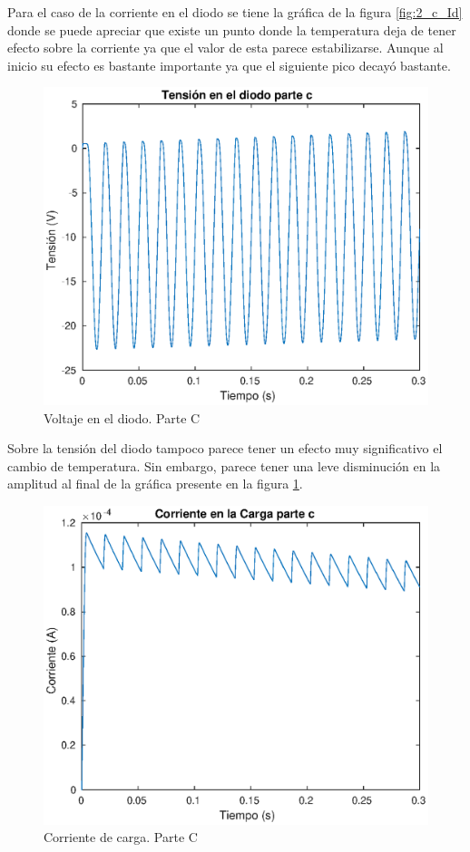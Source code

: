 \documentclass[12pt,letterpaper]{article}
\begin{document}
Para el caso de la corriente en el diodo se tiene la gráfica de la figura \ref{fig:2_c_Id} donde se puede apreciar que existe un punto donde la temperatura deja de tener efecto sobre la corriente ya que el valor de esta parece estabilizarse. Aunque al inicio su efecto es bastante importante ya que el siguiente pico decayó bastante.

\begin{figure}[ht!]
  \centering
  \includegraphics[width=0.8\linewidth]{pictures/Ejercicio2_c_Vd.eps}
  \caption{Voltaje en el diodo. Parte C}
  \label{fig:2_c_Vd}
\end{figure}

Sobre la tensión del diodo tampoco parece tener un efecto muy significativo el cambio de temperatura. Sin embargo, parece tener una leve disminución en la amplitud al final de la gráfica presente en la figura \ref{fig:2_c_Vd}.

\begin{figure}[ht!]
  \centering
  \includegraphics[width=0.8\linewidth]{pictures/Ejercicio2_c_carga.eps}
  \caption{Corriente de carga. Parte C}
  \label{fig:2_c_carga}
\end{figure}
\end{document}

